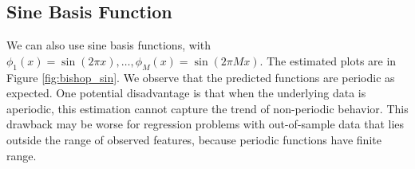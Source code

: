 \subsection{Sine Basis Function}
We can also use sine basis functions, with $\phi_1(x) = \sin(2\pi x), \ldots, \phi_M(x) = \sin(2\pi Mx)$. The estimated plots are in Figure \ref{fig:bishop_sin}. We observe that the predicted functions are periodic as expected. One potential disadvantage is that when the underlying data is aperiodic, this estimation cannot capture the trend of non-periodic behavior.  This drawback may be worse for regression problems with out-of-sample data that lies outside the range of observed features, because periodic functions have finite range.

